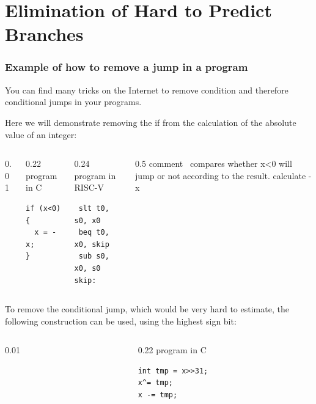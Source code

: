 \documentclass[aspectratio=169]{beamer}
\begin{document}
\section{Elimination of Hard to Predict Branches}

\begin{frame}[fragile]
\frametitle{Example of how to remove a jump in a program}

You can find many tricks on the Internet to remove condition and therefore conditional jumps in your programs.

Here we will demonstrate removing the if from the calculation of the absolute value of an integer:

\begin{columns}[T]
\begin{column}{0.01\textwidth}
\phantom{x}
\end{column}
\begin{column}{0.22\textwidth}
program in C
\begin{verbatim}
if (x<0) {
  x = -x;
}
\end{verbatim}
\end{column}

\begin{column}{0.24\textwidth}
program in RISC-V
\begin{verbatim}
 slt t0, s0, x0
 beq t0, x0, skip
 sub s0, x0, s0
skip:
\end{verbatim}
\end{column}
\begin{column}{0.5\textwidth}
\phantom{x}comment\
\small
compares whether x<0
will jump or not according to the result.
calculate -x
\end{column}
\end{columns}
\bigskip

To remove the conditional jump, which would be very hard to estimate, the following construction can be used, using the highest sign bit:
\begin{columns}[T]
\begin{column}{0.01\textwidth}
\phantom{x}
\end{column}
\begin{column}{0.22\textwidth}
program in C
\begin{verbatim}
int tmp = x>>31;
x^= tmp;
x -= tmp;
\end{verbatim}
\end{column}


\end{columns}
\end{frame}
\end{document}
